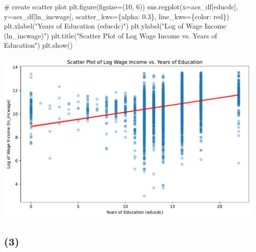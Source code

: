 \documentclass[
  letterpaper,
  DIV=11,
  numbers=noendperiod]{scrartcl}
\newenvironment{Shaded}{\begin{snugshade}}{\end{snugshade}}
\newcommand{\CommentTok}[1]{\textcolor[rgb]{0.37,0.37,0.37}{#1}}
\newcommand{\DecValTok}[1]{\textcolor[rgb]{0.68,0.00,0.00}{#1}}
\newcommand{\FloatTok}[1]{\textcolor[rgb]{0.68,0.00,0.00}{#1}}
\newcommand{\NormalTok}[1]{\textcolor[rgb]{0.00,0.23,0.31}{#1}}
\newcommand{\OperatorTok}[1]{\textcolor[rgb]{0.37,0.37,0.37}{#1}}
\newcommand{\StringTok}[1]{\textcolor[rgb]{0.13,0.47,0.30}{#1}}
\begin{document}
\begin{Shaded}
\begin{Highlighting}[]
\CommentTok{\# create scatter plot}
\NormalTok{plt.figure(figsize}\OperatorTok{=}\NormalTok{(}\DecValTok{10}\NormalTok{, }\DecValTok{6}\NormalTok{))}
\NormalTok{sns.regplot(x}\OperatorTok{=}\NormalTok{acs\_df[}\StringTok{\textquotesingle{}educdc\textquotesingle{}}\NormalTok{], y}\OperatorTok{=}\NormalTok{acs\_df[}\StringTok{\textquotesingle{}ln\_incwage\textquotesingle{}}\NormalTok{],}
\NormalTok{            scatter\_kws}\OperatorTok{=}\NormalTok{\{}\StringTok{\textquotesingle{}alpha\textquotesingle{}}\NormalTok{: }\FloatTok{0.3}\NormalTok{\}, line\_kws}\OperatorTok{=}\NormalTok{\{}\StringTok{\textquotesingle{}color\textquotesingle{}}\NormalTok{: }\StringTok{\textquotesingle{}red\textquotesingle{}}\NormalTok{\})}
\NormalTok{plt.xlabel(}\StringTok{"Years of Education (educdc)"}\NormalTok{)}
\NormalTok{plt.ylabel(}\StringTok{"Log of Wage Income (ln\_incwage)"}\NormalTok{)}
\NormalTok{plt.title(}\StringTok{"Scatter Plot of Log Wage Income vs. Years of Education"}\NormalTok{)}
\NormalTok{plt.show()}
\end{Highlighting}
\end{Shaded}

\includegraphics{Mini-Project-1_files/figure-pdf/cell-8-output-1.pdf}

\subsection{(3)}\label{section-3}
\end{document}
